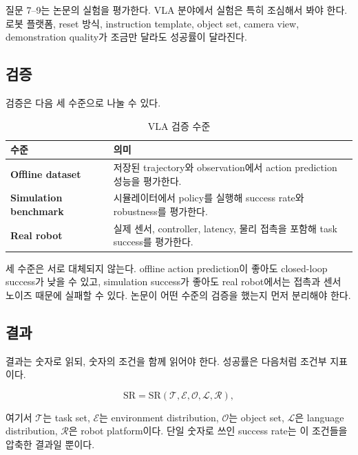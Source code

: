 질문 7--9는 논문의 실험을 평가한다. VLA 분야에서 실험은 특히 조심해서 봐야 한다. 로봇 플랫폼, reset 방식, instruction template, object set, camera view, demonstration quality가 조금만 달라도 성공률이 달라진다.

\subsection{검증}

검증은 다음 세 수준으로 나눌 수 있다.

\begin{table}[t]
  \centering
  \caption{VLA 검증 수준}
  \label{tab:validation_levels}
  \begin{tabularx}{\textwidth}{>{\bfseries}p{32mm}X}
    \toprule
    수준 & 의미 \\
    \midrule
    Offline dataset & 저장된 trajectory와 observation에서 action prediction 성능을 평가한다. \\
    Simulation benchmark & 시뮬레이터에서 policy를 실행해 success rate와 robustness를 평가한다. \\
    Real robot & 실제 센서, controller, latency, 물리 접촉을 포함해 task success를 평가한다. \\
    \bottomrule
  \end{tabularx}
\end{table}

세 수준은 서로 대체되지 않는다. offline action prediction이 좋아도 closed-loop success가 낮을 수 있고, simulation success가 좋아도 real robot에서는 접촉과 센서 노이즈 때문에 실패할 수 있다. 논문이 어떤 수준의 검증을 했는지 먼저 분리해야 한다.

\subsection{결과}

결과는 숫자로 읽되, 숫자의 조건을 함께 읽어야 한다. 성공률은 다음처럼 조건부 지표이다.

\begin{equation}
  \mathrm{SR}
  =
  \mathrm{SR}
  (
  \mathcal{T},
  \mathcal{E},
  \mathcal{O},
  \mathcal{L},
  \mathcal{R}
  ),
\end{equation}

여기서 $\mathcal{T}$는 task set, $\mathcal{E}$는 environment distribution, $\mathcal{O}$는 object set, $\mathcal{L}$은 language distribution, $\mathcal{R}$은 robot platform이다. 단일 숫자로 쓰인 success rate는 이 조건들을 압축한 결과일 뿐이다.

